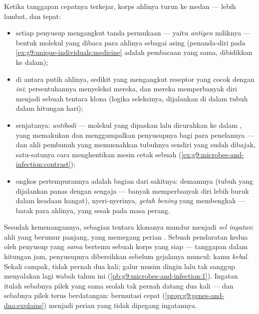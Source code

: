 \begin{proposition}\label{prop:g9:immune-defenses:specific}
Ketika tanggapan cepatnya terkejar, korps ahlinya turun ke
medan --- lebih lambat, dan tepat:
\begin{itemize}
  \item setiap penyusup mengangkut tanda permukaan --- yaitu
        \emph{antigen} miliknya --- bentuk
        molekul yang dibaca para ahlinya sebagai asing
        (penanda-diri pada
        \cref{ex:g9:unique-individuals:medicine} adalah
        pembacaan yang sama, dibidikkan ke dalam);
  \item di antara  putih ahlinya, sedikit yang mengangkut
        reseptor yang cocok dengan  \emph{ini};
        persentuhannya menyeleksi mereka, dan mereka
        memperbanyak diri menjadi sebuah tentara klona
        (logika seleksinya, dijalankan di dalam tubuh dalam
        hitungan hari);
  \item senjatanya: \emph{antibodi} ---
        molekul yang dipaskan lalu dicurahkan ke dalam
        , yang memakukan dan menggumpalkan penyusupnya
        bagi para penelannya --- dan ahli pembunuh yang
        memusnahkan  tubuhnya sendiri yang sudah dibajak,
        satu-satunya cara menghentikan mesin cetak sebuah
         (\cref{ex:g9:microbes-and-infection:contrast});
  \item ongkos pertempurannya adalah bagian dari sakitnya:
        demamnya (tubuh yang dijalankan panas dengan sengaja
        --- banyak  memperbanyak diri lebih buruk
        dalam keadaan hangat), nyeri-nyerinya, \emph{
        getah bening} yang membengkak --- barak para ahlinya,
        yang sesak pada masa perang.
\end{itemize}
\end{proposition}
\admitted

\begin{definition}\label{def:g9:immune-defenses:memory}
Sesudah kemenangannya, sebagian tentara klonanya mundur
menjadi \emph{sel ingatan}: ahli yang
berumur panjang, yang memegang perian . Sebuah
pendaratan kedua oleh penyusup yang \emph{sama} bertemu
sebuah korps yang siap --- tanggapan dalam hitungan jam,
penyusupnya dibersihkan sebelum gejalanya muncul: kamu
\emph{kebal}. Sekali campak, tidak pernah
dua kali; galur musim dingin lalu tak sanggup menyalakan
lagi wabah tahun ini
(\cref{pb:g9:microbes-and-infection:1}). Ingatan itulah
sebabnya pilek yang sama seolah tak pernah datang dua kali
--- dan sebabnya pilek terus berdatangan:  bermutasi
cepat (\cref{prop:g9:genes-and-dna:explains}) menjadi perian
yang tidak dipegang ingatannya.
\end{definition}

